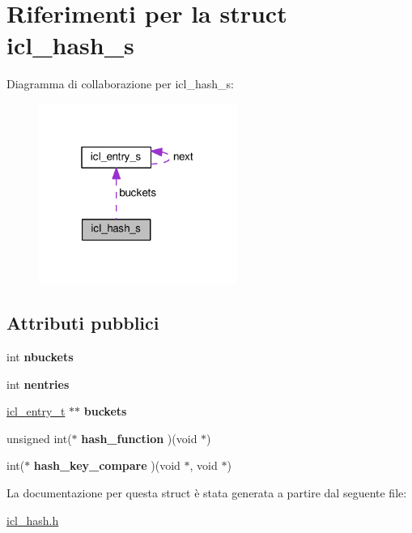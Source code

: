 \hypertarget{structicl__hash__s}{}\section{Riferimenti per la struct icl\+\_\+hash\+\_\+s}
\label{structicl__hash__s}


Diagramma di collaborazione per icl\+\_\+hash\+\_\+s\+:
\nopagebreak
\begin{figure}[H]
\begin{center}
\leavevmode
\includegraphics[width=184pt]{structicl__hash__s__coll__graph}
\end{center}
\end{figure}
\subsection*{Attributi pubblici}
\begin{DoxyCompactItemize}
\item 
int {\bfseries nbuckets}\hypertarget{structicl__hash__s_a18d5f1bc101356322a4db7a6cfeb9f7e}{}\label{structicl__hash__s_a18d5f1bc101356322a4db7a6cfeb9f7e}

\item 
int {\bfseries nentries}\hypertarget{structicl__hash__s_a7654114080ad222e0b8c2311ef3466fa}{}\label{structicl__hash__s_a7654114080ad222e0b8c2311ef3466fa}

\item 
\hyperlink{structicl__entry__s}{icl\+\_\+entry\+\_\+t} $\ast$$\ast$ {\bfseries buckets}\hypertarget{structicl__hash__s_a8d8b17cad1aca47e27486e4f49882df4}{}\label{structicl__hash__s_a8d8b17cad1aca47e27486e4f49882df4}

\item 
unsigned int($\ast$ {\bfseries hash\+\_\+function} )(void $\ast$)\hypertarget{structicl__hash__s_a06d96a5a8f9015e2ee6d6bf2e0876971}{}\label{structicl__hash__s_a06d96a5a8f9015e2ee6d6bf2e0876971}

\item 
int($\ast$ {\bfseries hash\+\_\+key\+\_\+compare} )(void $\ast$, void $\ast$)\hypertarget{structicl__hash__s_a6e3fc8d3a066a9c8fd5f45161119874e}{}\label{structicl__hash__s_a6e3fc8d3a066a9c8fd5f45161119874e}

\end{DoxyCompactItemize}


La documentazione per questa struct è stata generata a partire dal seguente file\+:\begin{DoxyCompactItemize}
\item 
\hyperlink{icl__hash_8h}{icl\+\_\+hash.\+h}\end{DoxyCompactItemize}
